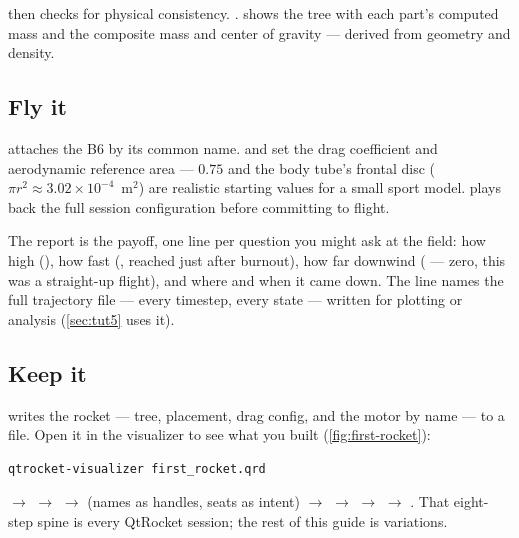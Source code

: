  then checks for physical consistency.
.  shows the tree with
each part's computed mass and the composite mass and center of gravity ---
derived from geometry and density.

\subsection*{Fly it}



 attaches the B6 by its common name.  and
 set the drag coefficient and aerodynamic reference area ---
$0.75$ and the body tube's frontal disc ($\pi r^2 \approx 3.02\times10^{-4}$~m$^2$)
are realistic starting values for a small sport model.  plays back
the full session configuration before committing to flight.

The  report is the payoff, one line per question you might ask at
the field: how high (), how fast (, reached just
after burnout), how far downwind ( --- zero, this was a
straight-up flight), and where and when it came down. The  line
names the full trajectory file --- every timestep, every state --- written for
plotting or analysis (\cref{sec:tut5} uses it).

\subsection*{Keep it}



 writes the rocket --- tree, placement, drag config, and the
motor by name --- to a  file. Open it in the visualizer to see what
you built (\cref{fig:first-rocket}):

\begin{verbatim}
qtrocket-visualizer first_rocket.qrd
\end{verbatim}


\begin{tip}
 $\rightarrow$  $\rightarrow$ 
$\rightarrow$  (names as handles, seats as intent) $\rightarrow$
 $\rightarrow$  $\rightarrow$ 
$\rightarrow$ . That eight-step spine is every QtRocket
session; the rest of this guide is variations.
\end{tip}
